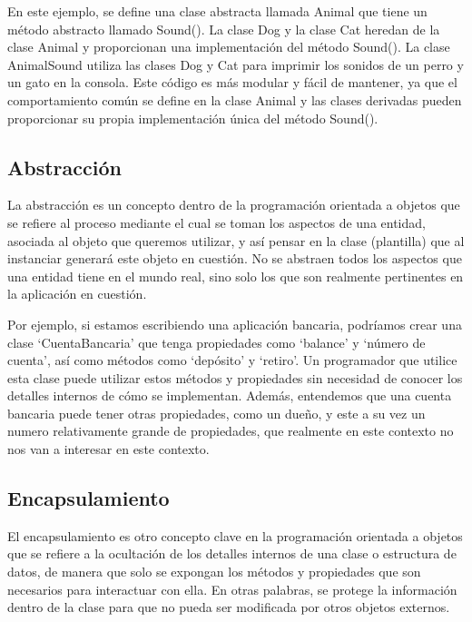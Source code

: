 \documentclass[executivepaper]{article}
\begin{document}
En este ejemplo, se define una clase abstracta llamada Animal que tiene un método abstracto llamado Sound(). La clase Dog y la clase Cat heredan de la clase Animal y proporcionan una implementación del método Sound(). La clase AnimalSound utiliza las clases Dog y Cat para imprimir los sonidos de un perro y un gato en la consola. Este código es más modular y fácil de mantener, ya que el comportamiento común se define en la clase Animal y las clases derivadas pueden proporcionar su propia implementación única del método Sound().

\subsection{Abstracción}

La abstracción es un concepto dentro de la programación orientada a objetos que se refiere al proceso mediante el cual se toman los aspectos de una entidad, asociada al objeto que queremos utilizar, y así pensar en la clase (plantilla) que al instanciar generará este objeto en cuestión. No se abstraen todos los aspectos que una entidad tiene en el mundo real, sino solo los que son realmente pertinentes en la aplicación en cuestión. 

Por ejemplo, si estamos escribiendo una aplicación bancaria, podríamos crear una clase \enquote*{CuentaBancaria} que tenga propiedades como \enquote*{balance} y \enquote*{número de cuenta}, así como métodos como \enquote*{depósito} y \enquote*{retiro}. Un programador que utilice esta clase puede utilizar estos métodos y propiedades sin necesidad de conocer los detalles internos de cómo se implementan. Además, entendemos que una cuenta bancaria puede tener otras propiedades, como un dueño, y este a su vez un numero relativamente grande de propiedades, que realmente en este contexto no nos van a interesar en este contexto.

\subsection{Encapsulamiento}

El encapsulamiento es otro concepto clave en la programación orientada a objetos que se refiere a la ocultación de los detalles internos de una clase o estructura de datos, de manera que solo se expongan los métodos y propiedades que son necesarios para interactuar con ella. En otras palabras, se protege la información dentro de la clase para que no pueda ser modificada por otros objetos externos.
\end{document}
